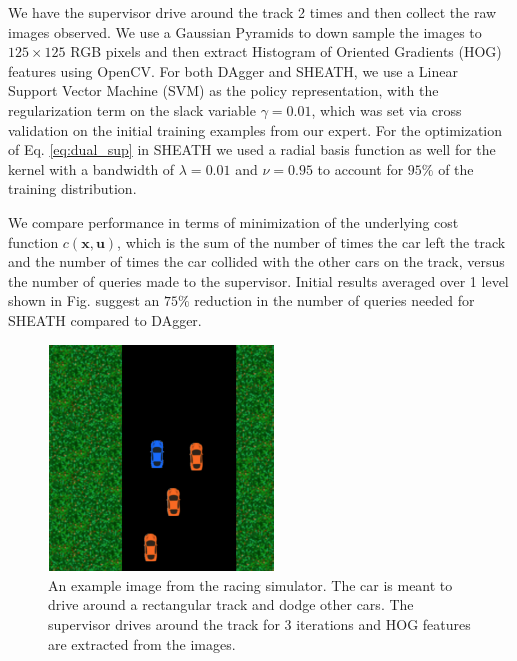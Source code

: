 \documentclass[10pt, conference]{ieeeconf}      %
\newcommand{\bu}{\mathbf{u}}
\newcommand{\bx}{\mathbf{x}}
\begin{document}
We have the supervisor drive around the track 2 times and then collect the raw images observed. We use a Gaussian Pyramids to down sample the images to $125 \times 125$ RGB pixels and then extract Histogram of Oriented Gradients (HOG) features using OpenCV. For both DAgger and SHEATH, we use a Linear Support Vector Machine (SVM) as the policy representation, with the regularization term on the slack variable $\gamma=0.01$, which was set via cross validation on the initial training examples from our expert. For the optimization of Eq. \ref{eq:dual_sup} in SHEATH we used a radial basis function as well for the kernel with a bandwidth of $\lambda=0.01$ and $\nu = 0.95$ to account for $95\%$ of the training distribution. 

We compare performance in terms of minimization of the underlying cost function $c(\bx,\bu)$, which is the sum of the number of times the car left the track and the number of times the car collided with the other cars on the track, versus the number of queries made to the supervisor. Initial results averaged over 1 level shown in Fig.  suggest an $75\%$ reduction in the number of queries needed for SHEATH compared to DAgger. 




\begin{figure}[t!]
\centering
\includegraphics[width=6cm, height=6cm]{figures/race_car_track_example.png}
\caption{ An example image from the racing simulator. The car is meant to drive around a rectangular track and dodge other cars. The supervisor drives around the track for 3 iterations and HOG features are extracted from the images.  }

\vspace*{-10pt}
\label{fig:race_car}
\end{figure}
\end{document}
